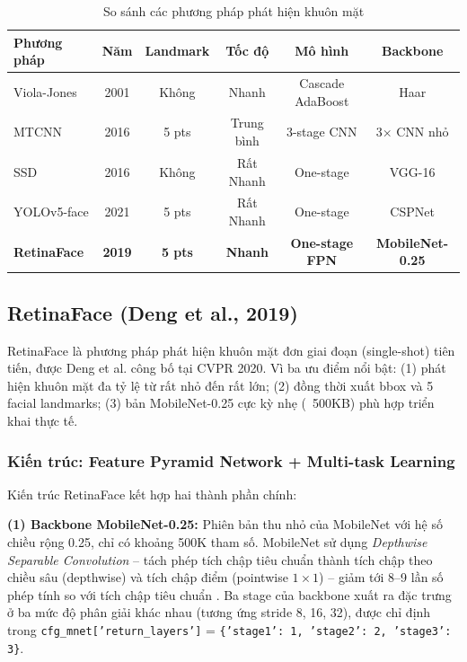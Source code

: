 \begin{table}[H]
\caption{So sánh các phương pháp phát hiện khuôn mặt}
\label{tab:face_detection_comparison}
\centering
\begin{tabular}{|l|c|c|c|c|c|}
\hline
\textbf{Phương pháp} & \textbf{Năm} & \textbf{Landmark} & \textbf{Tốc độ} & \textbf{Mô hình} & \textbf{Backbone} \\
\hline
Viola-Jones & 2001 & Không & Nhanh & Cascade AdaBoost & Haar \\
\hline
MTCNN & 2016 & 5 pts & Trung bình & 3-stage CNN & 3× CNN nhỏ \\
\hline
SSD & 2016 & Không & Rất Nhanh & One-stage & VGG-16 \\
\hline
YOLOv5-face & 2021 & 5 pts & Rất Nhanh & One-stage & CSPNet \\
\hline
\textbf{RetinaFace} & \textbf{2019} & \textbf{5 pts} & \textbf{Nhanh} & \textbf{One-stage FPN} & \textbf{MobileNet-0.25} \\
\hline
\end{tabular}
\end{table}

\subsection{RetinaFace (Deng et al., 2019)}
\label{subsec:retinaface}

RetinaFace \cite{Deng2019RetinaFace} là phương pháp phát hiện khuôn mặt đơn giai đoạn
(single-shot) tiên tiến, được Deng et al. công bố tại CVPR 2020. Vì ba ưu điểm nổi bật: (1) phát hiện khuôn mặt đa
tỷ lệ từ rất nhỏ đến rất lớn; (2) đồng thời xuất bbox và 5 facial landmarks; (3) bản
MobileNet-0.25 cực kỳ nhẹ (~500KB) phù hợp triển khai thực tế.

\subsubsection{Kiến trúc: Feature Pyramid Network + Multi-task Learning}
\label{subsubsec:retinaface_architecture}

Kiến trúc RetinaFace kết hợp hai thành phần chính:

\textbf{(1) Backbone MobileNet-0.25:} Phiên bản thu nhỏ của MobileNet \cite{Howard2017MobileNet}
với hệ số chiều rộng 0.25, chỉ có khoảng 500K tham số. MobileNet sử dụng
\textit{Depthwise Separable Convolution} -- tách phép tích chập tiêu chuẩn thành tích chập
theo chiều sâu (depthwise) và tích chập điểm (pointwise $1\times1$) -- giảm tới 8--9 lần
số phép tính so với tích chập tiêu chuẩn \cite{Howard2017MobileNet}. Ba stage của backbone
xuất ra đặc trưng ở ba mức độ phân giải khác nhau (tương ứng stride 8, 16, 32), được chỉ
định trong \texttt{cfg\_mnet['return\_layers']} = \texttt{\{'stage1': 1, 'stage2': 2, 'stage3': 3\}}.

